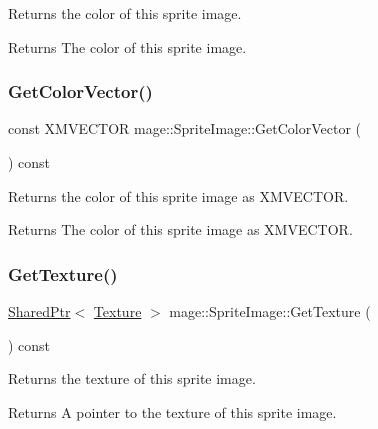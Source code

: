 Returns the color of this sprite image.

\begin{DoxyReturn}{Returns}
The color of this sprite image. 
\end{DoxyReturn}
\hypertarget{classmage_1_1_sprite_image_a08c7f8a40dd8097f849cb0469a12703c}{}\label{classmage_1_1_sprite_image_a08c7f8a40dd8097f849cb0469a12703c} 
\subsubsection{\texorpdfstring{Get\+Color\+Vector()}{GetColorVector()}}
{\footnotesize\ttfamily const X\+M\+V\+E\+C\+T\+OR mage\+::\+Sprite\+Image\+::\+Get\+Color\+Vector (\begin{DoxyParamCaption}{ }\end{DoxyParamCaption}) const\hspace{0.3cm}{\ttfamily [private]}}

Returns the color of this sprite image as {\ttfamily X\+M\+V\+E\+C\+T\+OR}.

\begin{DoxyReturn}{Returns}
The color of this sprite image as {\ttfamily X\+M\+V\+E\+C\+T\+OR}. 
\end{DoxyReturn}
\hypertarget{classmage_1_1_sprite_image_a3c04fb68baaf44e4ee8beb08aff26f35}{}\label{classmage_1_1_sprite_image_a3c04fb68baaf44e4ee8beb08aff26f35} 
\subsubsection{\texorpdfstring{Get\+Texture()}{GetTexture()}}
{\footnotesize\ttfamily \hyperlink{namespacemage_a1e01ae66713838a7a67d30e44c67703e}{Shared\+Ptr}$<$ \hyperlink{classmage_1_1_texture}{Texture} $>$ mage\+::\+Sprite\+Image\+::\+Get\+Texture (\begin{DoxyParamCaption}{ }\end{DoxyParamCaption}) const}

Returns the texture of this sprite image.

\begin{DoxyReturn}{Returns}
A pointer to the texture of this sprite image. 
\end{DoxyReturn}
\hypertarget{classmage_1_1_sprite_image_a20d8e8272cf62599f6c0e4b1ff4f3586}{}\label{classmage_1_1_sprite_image_a20d8e8272cf62599f6c0e4b1ff4f3586} 
